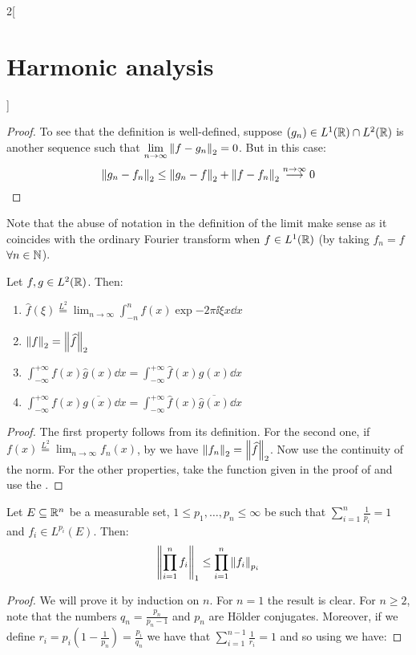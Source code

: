 \documentclass[../../../main_math.tex]{subfiles}
\begin{document}
\begin{multicols}{2}[\section{Harmonic analysis}]
\begin{proof}
    To see that the definition is well-defined, suppose $(g_n)\in L^1(\mathbb{R})\cap L^2(\mathbb{R})$ is another sequence such that $\displaystyle\lim_{n\to\infty}\left\|f-g_n\right\|_2=0$. But in this case:
    $$\left\|g_n-f_n\right\|_2\leq\left\|g_n-f\right\|_2+\left\|f-f_n\right\|_2\overset{n\to\infty}{\longrightarrow}0$$
  \end{proof}
  \begin{remark}
    Note that the abuse of notation in the definition of the limit make sense as it coincides with the ordinary Fourier transform when $f\in L^1(\mathbb{R})$ (by taking $f_n=f$ $\forall n\in\mathbb{N}$).
  \end{remark}
  \begin{theorem}
    Let $f,g\in L^2(\mathbb{R})$. Then:
    \begin{enumerate}
      \item $\displaystyle\widehat{f}(\xi)\overset{L^2}{=}\lim_{n\to\infty}\int_{-n}^nf(x)\exp{-2\pi\ii \xi x}\dd{x}$
      \item $\left\|f\right\|_2=\left\|\widehat{f}\right\|_2$
      \item $\displaystyle\int_{-\infty}^{+\infty}f(x)\widehat{g}(x)\dd{x}=\int_{-\infty}^{+\infty}\widehat{f}(x)g(x)\dd{x}$
      \item $\displaystyle\int_{-\infty}^{+\infty}f(x)\overline{g(x)}
              \dd{x}=\int_{-\infty}^{+\infty}\widehat{f}(x)\overline{\widehat{g}(x)}\dd{x}$
    \end{enumerate}
  \end{theorem}
  \begin{proof}
    The first property follows from its definition. For the second one, if $\displaystyle f(x)\overset{L^2}{=}\lim_{n\to\infty}f_n(x)$, by  we have $\left\|f_n\right\|_2=\left\|\widehat{f}\right\|_2$. Now use the continuity of the norm. For the other properties, take the function given in the proof of  and use the .
  \end{proof}
  \begin{lemma}\label{HA:holderGeneralized}
    Let $E\subseteq\mathbb{R}^n$ be a measurable set, $1\leq p_1,\ldots,p_n\leq \infty$ be such that $\sum_{i=1}^n\frac{1}{p_i}=1$ and ${f_i}\in L^{p_i}(E)$. Then:
    $$\left\|\prod_{i=1}^{n}f_i\right\|_1\leq\prod_{i=1}^{n}\left\|{f_i}\right\|_{p_i}$$
  \end{lemma}
  \begin{proof}
    We will prove it by induction on $n$. For $n=1$ the result is clear. For $n\geq 2$, note that the numbers $q_n=\frac{p_n}{p_n-1}$ and $p_n$ are Hölder conjugates. Moreover, if we define $r_i=p_i\left(1-\frac{1}{p_n}\right)=\frac{p_i}{q_n}$ we have that $\sum_{i=1}^{n-1}\frac{1}{r_i}=1$ and so using  we have:

\end{proof}
\end{multicols}
\end{document}
